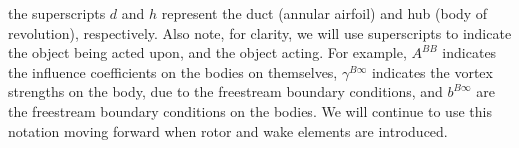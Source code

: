 \where the superscripts \(d\) and \(h\) represent the duct (annular airfoil) and hub (body of revolution), respectively.
Also note, for clarity, we will use superscripts to indicate the object being acted upon, and the object acting.
For example, \(A^{BB}\) indicates the influence coefficients on the bodies on themselves,  \(\gamma^{B\infty}\) indicates the vortex strengths on the body, due to the freestream boundary conditions, and \(b^{B\infty}\) are the freestream boundary conditions on the bodies.
We will continue to use this notation moving forward when rotor and wake elements are introduced.


%










